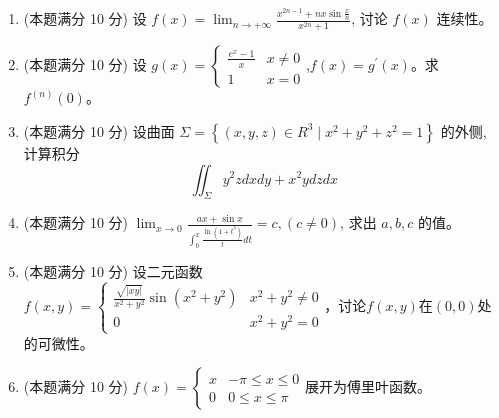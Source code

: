 \begin{enumerate}



\item 
(本题满分 10 分)
设 $f(x)=\lim _{n \rightarrow+\infty} \frac{x^{2 n-1}+n x \sin \frac{x}{n}}{x^{2 n}+1}$, 讨论 $f(x)$ 连续性。



\item 
(本题满分 10 分)
设 $g(x)=\left\{\begin{array}{cc}\frac{e^{x}-1}{x} & x \neq 0 \\ 1 & x=0\end{array} \right.$,$f(x)=g^{\prime}(x)$。求 $f^{(n)}(0)$。



\newpage
\item 
(本题满分 10 分)
设曲面 $\Sigma=\left\{(x, y, z) \in R^{3} \mid x^{2}+y^{2}+z^{2}=1\right\}$ 的外侧, 计算积分
\[ 
\iint_{\Sigma} y^{2} z d x d y+x^{2} y d z d x
 \]




\item 
(本题满分 10 分)
$\lim _{x \rightarrow 0} \frac{a x+\sin x}{\int_{b}^{x} \frac{\ln \left(1+t^{3}\right)}{t} d t}=c,(c \neq 0)$, 求出 $a, b, c$ 的值。




\item 
(本题满分 10 分)
设二元函数 $f(x, y)=\left\{\begin{array}{ll}\frac{\sqrt{|x y|}}{x^{2}+y^{2}} \sin \left(x^{2}+y^{2}\right) & x^{2}+y^{2} \neq 0 \\ 0 & x^{2}+y^{2}=0\end{array}\right.$，讨论$ f(x,y) $在$ (0,0) $处的可微性。	





\item 
(本题满分 10 分)
$f(x)=\left\{\begin{array}{cc}x & -\pi \leq x \leq 0 \\ 0 & 0 \leq x \leq \pi\end{array}\right.$展开为傅里叶函数。





\end{enumerate}
